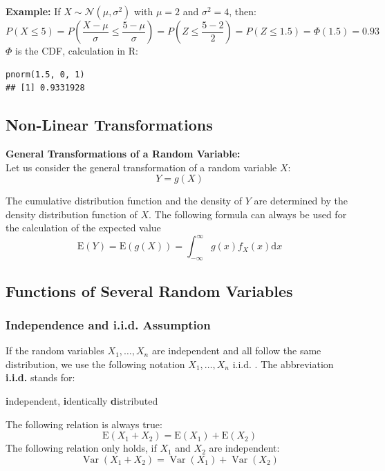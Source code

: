 \documentclass[11pt]{article}
\begin{document}
\textbf{Example:} If $X \sim \mathcal{N}\left(\mu, \sigma^2\right)$ with $\mu=2$ and $\sigma^2=4$, then:
\begin{equation*}
	P(X \leq 5)=P\left(\frac{X-\mu}{\sigma} \leq \frac{5-\mu}{\sigma}\right)=P\left(Z \leq \frac{5-2}{2}\right)=P(Z \leq 1.5)=\Phi(1.5)=0.93
\end{equation*}
$\Phi$ is the CDF, calculation in R: 
\begin{verbatim}
pnorm(1.5, 0, 1)
## [1] 0.9331928
\end{verbatim}

\subsection{Non-Linear Transformations}

\begin{definition}
	\textbf{General Transformations of a Random Variable:}\\
	Let us consider the general transformation of a random variable $X$:
	\begin{equation*}
		Y=g(X)
	\end{equation*}
	
	The cumulative distribution function and the density of $Y$ are determined by the density distribution function of $X$. The following formula can always be used for the calculation of the expected value
	\begin{equation*}
		\mathrm{E}(Y)=\mathrm{E}(g(X))=\int_{-\infty}^{\infty} g(x) f_X(x) \mathrm{d} x
	\end{equation*}
\end{definition}

\subsection{Functions of Several Random Variables}
\subsubsection{Independence and i.i.d. Assumption}
If the random variables $X_1, \ldots, X_n$ are independent and all follow the same distribution, we use the following notation $X_1, \ldots, X_n \text{ i.i.d. }$. The abbreviation \textbf{i.i.d.} stands for:
\begin{center}
\textbf{i}ndependent, \textbf{i}dentically \textbf{d}istributed
\end{center}

\noindent
The following relation is always true:
$$
\mathrm{E}\left(X_1+X_2\right)=\mathrm{E}\left(X_1\right)+\mathrm{E}\left(X_2\right)
$$
The following relation only holds, if $X_1$ and $X_2$ are independent:
$$
\operatorname{Var}\left(X_1+X_2\right)=\operatorname{Var}\left(X_1\right)+\operatorname{Var}\left(X_2\right)
$$
\end{document}
